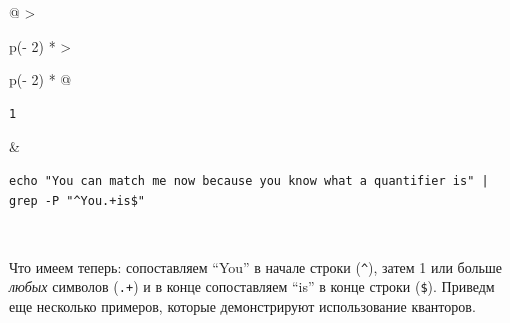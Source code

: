 \documentclass{article}
\begin{document}
\begin{longtable}[]{@{}
  >{\raggedright\arraybackslash}p{(\columnwidth - 2\tabcolsep) * }
  >{\raggedright\arraybackslash}p{(\columnwidth - 2\tabcolsep) * }@{}}
\toprule
\endhead
\begin{minipage}[t]{\linewidth}\raggedright
\begin{verbatim}
1
\end{verbatim}
\end{minipage} & \begin{minipage}[t]{\linewidth}\raggedright
\begin{verbatim}
echo "You can match me now because you know what a quantifier is" | grep -P "^You.+is$"
\end{verbatim}
\end{minipage} \\ \addlinespace
\bottomrule
\end{longtable}

Что имеем теперь: сопоставляем ``You'' в начале строки (\texttt{\^{}}),
затем 1 или больше \emph{любых} символов (\texttt{.+}) и в конце
сопоставляем ``is'' в конце строки (\texttt{\$}). Приведм еще несколько
примеров, которые демонстрируют использование кванторов.
\end{document}
